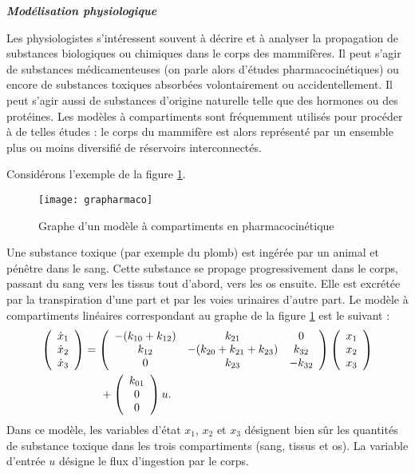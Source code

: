 \begin{exemple}{\bf \em Modélisation physiologique}

Les physiologistes s'intéressent souvent à décrire et à analyser la 
propagation de substances biologiques ou chimiques dans le corps des
mammifères. Il peut s'agir de substances médicamenteuses (on parle alors
d'études pharmacocinétiques) ou encore de substances toxiques absorbées
volontairement ou accidentellement. Il peut s'agir aussi de substances d'origine
naturelle telle que des hormones ou des protéines. Les modèles à 
compartiments sont fréquemment utilisés pour procéder à de telles 
études : le corps du mammifère est alors représenté par un ensemble
plus ou moins diversifié de réservoirs interconnectés. 

Considérons l'exemple
de la figure \ref{Fig:grapharmaco}.
\begin{figure}[ht] 
\begin{center}
\texttt{[image: grapharmaco]}
\caption{Graphe d'un modèle à compartiments en pharmacocinétique}
\label{Fig:grapharmaco}
\end{center} 
\end{figure}
Une substance toxique (par exemple du plomb) est ingérée par un animal et
pénêtre dans le sang. Cette substance  se propage progressivement
dans le corps, passant du sang vers les tissus tout d'abord, vers les os ensuite.
Elle est excrétée par la transpiration d'une part et par les voies urinaires
d'autre part. Le modèle à compartiments linéaires correspondant
au graphe de la figure \ref{Fig:grapharmaco} est le suivant :
\begin{equation*} \begin{split}
\bma{c} \dot x_1 \\ \dot x_2 \\ \dot x_3 \ema &= 
\bma{ccc} -(k_{10} + k_{12}) & k_{21} & 0 \\ 
k_{12} & -(k_{20} + k_{21} + k_{23}) & k_{32} \\ 0 & k_{23} & - k_{32} \ema
\bma{c} x_1 \\ x_2 \\ x_3 \ema \\
& \hd + \bma{c} k_{ 01}\\ 0 \\ 0 \ema u.
\end{split} \end{equation*}
Dans ce modèle, les variables d'état $x_1$, $x_2$ et $x_3$ désignent
bien s\^ur les quantités de substance toxique dans les trois compartiments
(sang, tissus et os). La variable d'entrée $u$ désigne le flux d'ingestion 
par le corps.
\cqfd
\end{exemple}


